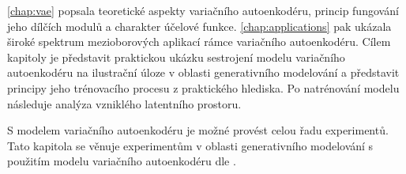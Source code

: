 \autoref{chap:vae} popsala teoretické aspekty variačního autoenkodéru, princip fungování jeho dílčích modulů a charakter účelové funkce.
\autoref{chap:applications} pak ukázala široké spektrum mezioborových aplikací rámce variačního autoenkodéru.
Cílem  kapitoly je představit praktickou ukázku sestrojení modelu variačního autoenkodéru na ilustrační úloze v oblasti generativního modelování a představit principy jeho trénovacího procesu z praktického hlediska.
Po natrénování modelu následuje analýza vzniklého latentního prostoru.

S modelem variačního autoenkodéru je možné provést celou řadu experimentů.
Tato kapitola se věnuje experimentům v oblasti generativního modelování s použitím modelu variačního autoenkodéru dle \textcite{Kingma2014}.